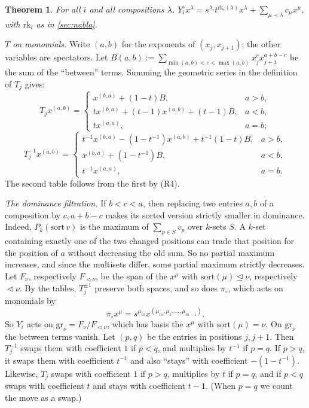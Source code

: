 \documentclass[11pt]{amsart}
\newtheorem{theorem}{Theorem}[section]
\theoremstyle{definition}
\theoremstyle{remark}
\numberwithin{equation}{section}
\begin{document}
\begin{theorem}\label{thm:tri}
For all $i$ and all compositions $\lambda$, $Y^\circ_ix^\lambda=s^{\lambda_i}t^{\mathrm{rk}_i(\lambda)}x^\lambda+\sum_{\mu\prec\lambda}c_\mu x^\mu$, with $\mathrm{rk}_i$ as in \cref{sec:nabla}.
\end{theorem}

\emph{$T$ on monomials.} Write $(a,b)$ for the exponents of $(x_j,x_{j+1})$; the other variables are spectators. Let $B(a,b):=\sum_{\min(a,b)<c<\max(a,b)}x_j^cx_{j+1}^{a+b-c}$ be the sum of the ``between'' terms. Summing the geometric series in the definition of $T_j$ gives:
\[ T_jx^{(a,b)}=\begin{cases}x^{(b,a)}+(1-t)B,&a>b,\\ tx^{(b,a)}+(t-1)x^{(a,b)}+(t-1)B,&a<b,\\ tx^{(a,a)},&a=b;\end{cases} \]
\[ T_j^{-1}x^{(a,b)}=\begin{cases}t^{-1}x^{(b,a)}-(1-t^{-1})x^{(a,b)}+t^{-1}(1-t)B,&a>b,\\ x^{(b,a)}+(1-t^{-1})B,&a<b,\\ t^{-1}x^{(a,a)},&a=b.\end{cases} \]
The second table follows from the first by (R4).

\emph{The dominance filtration.} If $b<c<a$, then replacing two entries $a,b$ of a composition by $c,a+b-c$ makes its sorted version strictly smaller in dominance. Indeed, $P_k(\mathrm{sort}\,v)$ is the maximum of $\sum_{p\in S}v_p$ over $k$-sets $S$. A $k$-set containing exactly one of the two changed positions can trade that position for the position of $a$ without decreasing the old sum. So no partial maximum increases, and since the multisets differ, some partial maximum strictly decreases. Let $F_\nu$, respectively $F_{\vartriangleleft\nu}$, be the span of the $x^\mu$ with $\mathrm{sort}(\mu)\trianglelefteq\nu$, respectively $\vartriangleleft\nu$. By the tables, $T_j^{\pm1}$ preserve both spaces, and so does $\pi_\circ$, which acts on monomials by
\[ \pi_\circ x^\mu=s^{\mu_m}x^{(\mu_m,\mu_1,\dots,\mu_{m-1})} . \]
So $Y^\circ_i$ acts on $\mathrm{gr}_\nu=F_\nu/F_{\vartriangleleft\nu}$, which has basis the $x^\mu$ with $\mathrm{sort}(\mu)=\nu$. On $\mathrm{gr}_\nu$ the between terms vanish. Let $(p,q)$ be the entries in positions $j,j+1$. Then $T_j^{-1}$ swaps them with coefficient $1$ if $p<q$, and multiplies by $t^{-1}$ if $p=q$. If $p>q$, it swaps them with coefficient $t^{-1}$ and also ``stays'' with coefficient $-(1-t^{-1})$. Likewise, $T_j$ swaps with coefficient $1$ if $p>q$, multiplies by $t$ if $p=q$, and if $p<q$ swaps with coefficient $t$ and stays with coefficient $t-1$. (When $p=q$ we count the move as a swap.)
\end{document}
